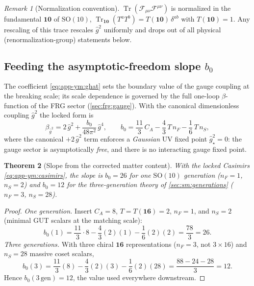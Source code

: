 \documentclass[11pt]{article}
\theoremstyle{plain}
\newtheorem{theorem}{Theorem}[section]
\theoremstyle{definition}
\theoremstyle{remark}
\newtheorem{remark}[theorem]{Remark}
\newcommand{\SO}[1]{\mathrm{SO}(#1)}
\newcommand{\Tr}{\operatorname{Tr}}
\newcommand{\SOTen}{\SO{10}}
\newcommand{\ghat}{\hat g}
\begin{document}
\begin{remark}[Normalization convention]\label{rem:app-ym:norm}
$\Tr(\mathcal F_{\mu\nu}\mathcal F^{\mu\nu})$ is normalized in the
fundamental $\mathbf{10}$ of $\SOTen$, $\Tr_{\mathbf{10}}(T^{a}T^{b})
=T(\mathbf{10})\,\delta^{ab}$ with $T(\mathbf{10})=1$. Any rescaling of
this trace rescales $\ghat^{2}$ uniformly and drops out of all
physical (renormalization-group) statements below.
\end{remark}

\subsection{Feeding the asymptotic-freedom slope $b_{0}$}
\label{sec:app-ym:b0}

The coefficient \eqref{eq:app-ym:ghat} sets the boundary value of the
gauge coupling at the breaking scale; its scale dependence is governed
by the full one-loop $\beta$-function of the FRG sector
(\autoref{sec:frg:gauge}). With the canonical dimensionless coupling
$\ghat^{2}$ the locked form is
\begin{equation}\label{eq:app-ym:beta}
  \beta_{\ghat^{2}}
  =2\,\ghat^{2}+\frac{b_{0}}{48\pi^{2}}\,\ghat^{4},
  \qquad
  b_{0}=\frac{11}{3}\,C_{A}-\frac{4}{3}\,T\,n_{F}
        -\frac16\,T\,n_{S} ,
\end{equation}
where the canonical $+2\,\ghat^{2}$ term enforces a \emph{Gaussian} UV
fixed point $\ghat^{2}_{\star}=0$: the gauge sector is asymptotically
\emph{free}, and there is no interacting gauge fixed point.

\begin{theorem}[Slope from the corrected matter content]
\label{thm:app-ym:b0}
With the locked Casimirs \eqref{eq:app-ym:casimirs}, the slope is
$b_{0}=26$ for one $\SOTen$ generation ($n_{F}=1$, $n_{S}=2$) and
$b_{0}=12$ for the three-generation theory of \autoref{sec:sm:generations}
($n_{F}=3$, $n_{S}=28$).
\end{theorem}

\begin{proof}
\emph{One generation.} Insert $C_{A}=8$, $T=T(\mathbf{16})=2$, $n_{F}=1$,
and $n_{S}=2$ (minimal GUT scalars at the matching scale):
\begin{equation}\label{eq:app-ym:b0one}
  b_{0}(1)
  =\frac{11}{3}\cdot 8-\frac43(2)(1)-\frac16(2)(2)
  =\frac{78}{3}=26 .
\end{equation}
\emph{Three generations.} With three chiral $\mathbf{16}$ representations
($n_{F}=3$, not $3\times16$) and $n_{S}=28$ massive coset scalars,
\begin{equation}\label{eq:app-ym:b0lin}
  b_{0}(3)
  =\frac{11}{3}(8)-\frac43(2)(3)-\frac16(2)(28)
  =\frac{88-24-28}{3}=12 .
\end{equation}
Hence $b_{0}(3\,\mathrm{gen})=12$, the value used everywhere downstream.
\end{proof}
\end{document}
